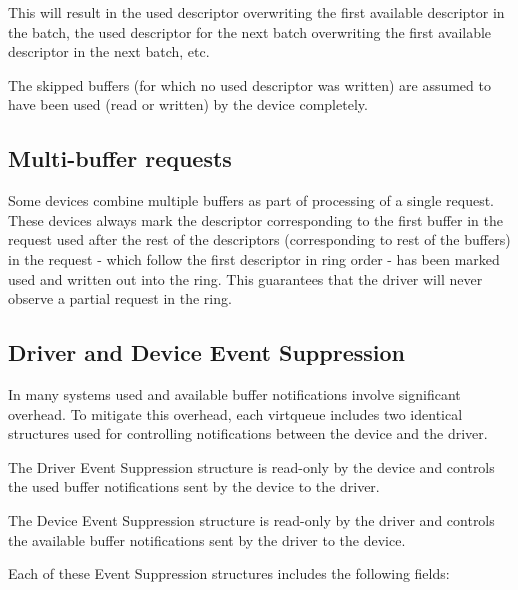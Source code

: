 This will result in the used descriptor overwriting the first
available descriptor in the batch, the used descriptor for the
next batch overwriting the first available descriptor in the next
batch, etc.

The skipped buffers (for which no used descriptor was written)
are assumed to have been used (read or written) by the
device completely.

\subsection{Multi-buffer requests}
\label{sec:Packed Virtqueues / Multi-buffer requests}
Some devices combine multiple buffers as part of processing of a
single request.  These devices always mark the descriptor
corresponding to the first buffer in the request used after the
rest of the descriptors (corresponding to rest of the buffers) in
the request - which follow the first descriptor in ring order -
has been marked used and written out into the ring.  This
guarantees that the driver will never observe a partial request
in the ring.

\subsection{Driver and Device Event Suppression}
\label{sec:Packed Virtqueues / Driver and Device Event Suppression}
In many systems used and available buffer notifications involve
significant overhead. To mitigate this overhead,
each virtqueue includes two identical structures used for
controlling notifications between the device and the driver.

The Driver Event Suppression structure is read-only by the
device and controls the used buffer notifications sent by the device
to the driver.

The Device Event Suppression structure is read-only by
the driver and controls the available buffer notifications sent by the
driver to the device.

Each of these Event Suppression structures includes the following fields:

